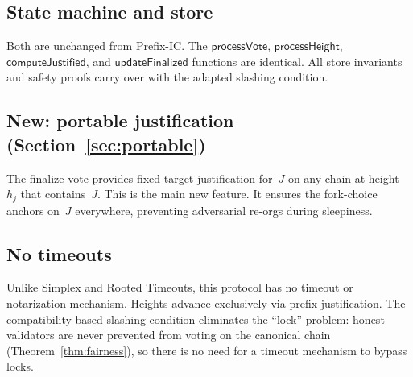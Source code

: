 \ifx\litemode\undefined\documentclass{article}\fi
\theoremstyle{plain}
\theoremstyle{definition}
\theoremstyle{remark}
\begin{document}
\subsection*{State machine and store}

Both are unchanged from Prefix-IC.
The $\textsf{processVote}$, $\textsf{processHeight}$, $\textsf{computeJustified}$, and $\textsf{updateFinalized}$ functions are identical.
All store invariants and safety proofs carry over with the adapted slashing condition.

\subsection*{New: portable justification (Section~\ref{sec:portable})}

The finalize vote provides fixed-target justification for~$J$ on any chain at height~$h_j$ that contains~$J$.
This is the main new feature.
It ensures the fork-choice anchors on~$J$ everywhere, preventing adversarial re-orgs during sleepiness.

\subsection*{No timeouts}

Unlike Simplex and Rooted Timeouts, this protocol has no timeout or notarization mechanism.
Heights advance exclusively via prefix justification.
The compatibility-based slashing condition eliminates the ``lock'' problem: honest validators are never prevented from voting on the canonical chain (Theorem~\ref{thm:fairness}), so there is no need for a timeout mechanism to bypass locks.
\end{document}
